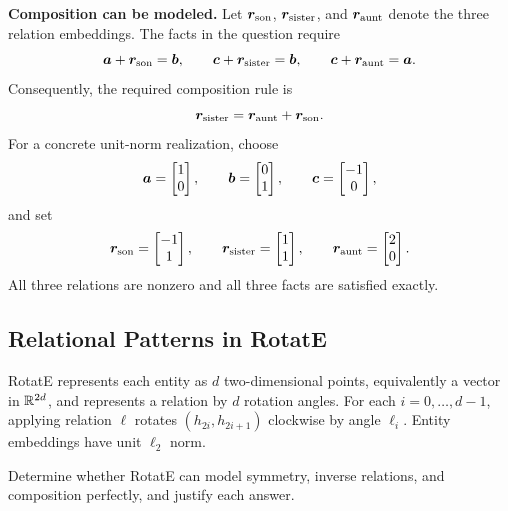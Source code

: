 \begin{solution}
\textbf{Composition can be modeled.}  Let \(\bm{r}_{\rm son}\),
\(\bm{r}_{\rm sister}\), and \(\bm{r}_{\rm aunt}\) denote the three relation
embeddings.  The facts in the question require
\[
  \bm{a}+\bm{r}_{\rm son}=\bm{b},
  \qquad
  \bm{c}+\bm{r}_{\rm sister}=\bm{b},
  \qquad
  \bm{c}+\bm{r}_{\rm aunt}=\bm{a}.
\]
Consequently, the required composition rule is
\[
  \bm{r}_{\rm sister}
  =\bm{r}_{\rm aunt}+\bm{r}_{\rm son}.
\]
For a concrete unit-norm realization, choose
\[
  \bm{a}=\begin{bmatrix}1\\0\end{bmatrix},\qquad
  \bm{b}=\begin{bmatrix}0\\1\end{bmatrix},\qquad
  \bm{c}=\begin{bmatrix}-1\\0\end{bmatrix},
\]
and set
\[
  \bm{r}_{\rm son}=\begin{bmatrix}-1\\1\end{bmatrix},\qquad
  \bm{r}_{\rm sister}=\begin{bmatrix}1\\1\end{bmatrix},\qquad
  \bm{r}_{\rm aunt}=\begin{bmatrix}2\\0\end{bmatrix}.
\]
All three relations are nonzero and all three facts are satisfied exactly.
\end{solution}

\subsection{Relational Patterns in RotatE}

RotatE represents each entity as \(d\) two-dimensional points, equivalently a
vector in \(\mathbb{R}^{2d}\), and represents a relation by \(d\) rotation angles. For
each \(i=0,\ldots,d-1\), applying relation \(\ell\) rotates
\((h_{2i},h_{2i+1})\) clockwise by angle \(\ell_i\). Entity embeddings have
unit \(\ell_2\) norm.

Determine whether RotatE can model symmetry, inverse relations, and composition
perfectly, and justify each answer.

